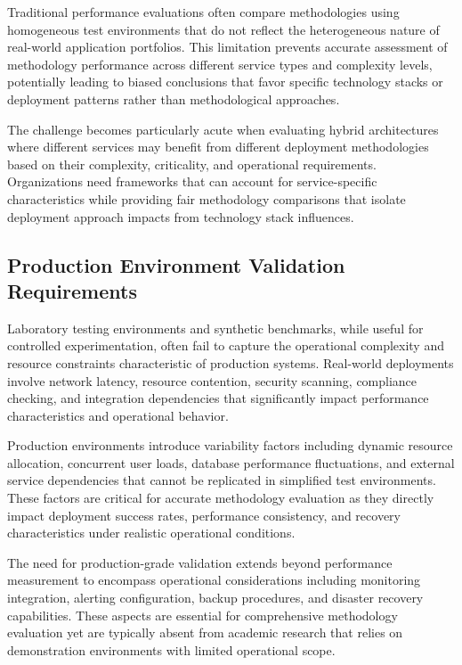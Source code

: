 Traditional performance evaluations often compare methodologies using homogeneous test environments that do not reflect the heterogeneous nature of real-world application portfolios. This limitation prevents accurate assessment of methodology performance across different service types and complexity levels, potentially leading to biased conclusions that favor specific technology stacks or deployment patterns rather than methodological approaches.

The challenge becomes particularly acute when evaluating hybrid architectures where different services may benefit from different deployment methodologies based on their complexity, criticality, and operational requirements. Organizations need frameworks that can account for service-specific characteristics while providing fair methodology comparisons that isolate deployment approach impacts from technology stack influences.

\subsection{Production Environment Validation Requirements}
Laboratory testing environments and synthetic benchmarks, while useful for controlled experimentation, often fail to capture the operational complexity and resource constraints characteristic of production systems. Real-world deployments involve network latency, resource contention, security scanning, compliance checking, and integration dependencies that significantly impact performance characteristics and operational behavior.

Production environments introduce variability factors including dynamic resource allocation, concurrent user loads, database performance fluctuations, and external service dependencies that cannot be replicated in simplified test environments. These factors are critical for accurate methodology evaluation as they directly impact deployment success rates, performance consistency, and recovery characteristics under realistic operational conditions.

The need for production-grade validation extends beyond performance measurement to encompass operational considerations including monitoring integration, alerting configuration, backup procedures, and disaster recovery capabilities. These aspects are essential for comprehensive methodology evaluation yet are typically absent from academic research that relies on demonstration environments with limited operational scope.


